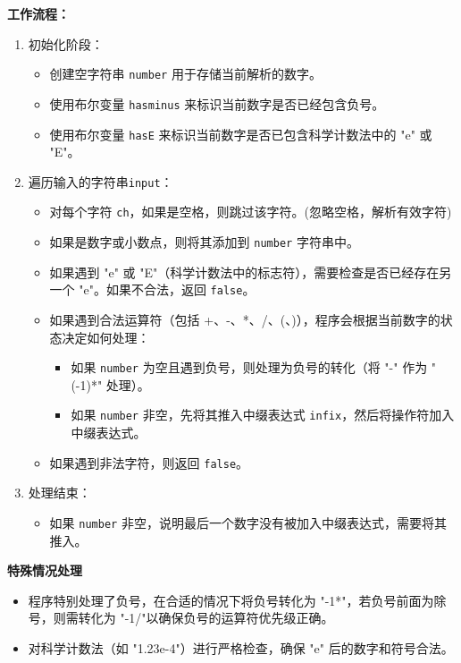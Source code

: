 \documentclass[UTF8]{ctexart}
\begin{document}
\textbf{工作流程：}
\begin{enumerate}
    \item 初始化阶段：
    \begin{itemize}
        \item 创建空字符串 \texttt{number} 用于存储当前解析的数字。
        \item 使用布尔变量 \texttt{hasminus} 来标识当前数字是否已经包含负号。
        \item 使用布尔变量 \texttt{hasE} 来标识当前数字是否已包含科学计数法中的 "e" 或 "E"。
    \end{itemize}

    \item 遍历输入的字符串\texttt{input}：
    \begin{itemize}
        \item 对每个字符 \texttt{ch}，如果是空格，则跳过该字符。(忽略空格，解析有效字符)
        \item 如果是数字或小数点，则将其添加到 \texttt{number} 字符串中。
        \item 如果遇到 "e" 或 "E"（科学计数法中的标志符），需要检查是否已经存在另一个 "e"。如果不合法，返回 \texttt{false}。
        \item 如果遇到合法运算符（包括 +、-、*、/、(、)），程序会根据当前数字的状态决定如何处理：
        \begin{itemize}
            \item 如果 \texttt{number} 为空且遇到负号，则处理为负号的转化（将 "-" 作为 "(-1)*" 处理）。
            \item 如果 \texttt{number} 非空，先将其推入中缀表达式 \texttt{infix}，然后将操作符加入中缀表达式。
        \end{itemize}
        \item 如果遇到非法字符，则返回 \texttt{false}。
    \end{itemize}

    \item 处理结束：
    \begin{itemize}
        \item 如果 \texttt{number} 非空，说明最后一个数字没有被加入中缀表达式，需要将其推入。
    \end{itemize}

\end{enumerate}

\textbf{特殊情况处理}
\begin{itemize}
    \item 程序特别处理了负号，在合适的情况下将负号转化为 "-1*"，若负号前面为除号，则需转化为 "-1/"以确保负号的运算符优先级正确。
    \item 对科学计数法（如 "1.23e-4"）进行严格检查，确保 "e" 后的数字和符号合法。
\end{itemize}
\end{document}
